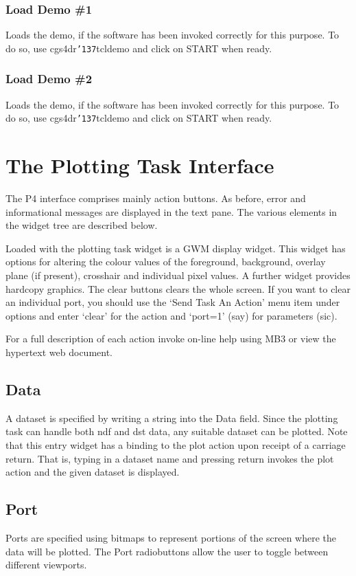 \documentclass[a4paper]{book}
\renewcommand{\_}{{\tt\char'137}}
\begin{document}
\subsubsection{Load Demo \#1}
Loads the demo, if the software has been invoked correctly for this purpose.
To do so, use cgs4dr\_tcldemo and click on START when ready.

\subsubsection{Load Demo \#2}
Loads the demo, if the software has been invoked correctly for this purpose.
To do so, use cgs4dr\_tcldemo and click on START when ready.

\section{The Plotting Task Interface}
The P4 interface comprises mainly action buttons.
As before, error and informational messages are displayed in the text pane.
The various elements in the widget tree are described below. 

Loaded with the plotting task widget is a GWM display widget. This widget
has options for altering the colour values of the foreground, background,
overlay plane (if present), crosshair and individual pixel values. A further
widget provides hardcopy graphics. The {\sc clear} buttons clears the whole screen.
If you want to clear an individual port, you should use the `Send Task An Action'
menu item under options and enter `clear' for the {\sc action} and `port=1' (say)
for {\sc parameters} (sic).

For a full description of each action invoke on-line help using MB3 or view the hypertext web document.

\subsection{Data}
A dataset is specified by writing a string into the {\sf Data} field. Since
the plotting task can handle both {\sc ndf} and {\sc dst} data, any suitable
dataset can be plotted. Note that this entry widget has a binding to the plot
action upon receipt of a carriage return. That is, typing in a dataset name
and pressing {\sc return} invokes the plot action and the given dataset is
displayed.

\subsection{Port}
Ports are specified using bitmaps to represent portions of the screen 
where the data will be plotted. 
The {\sf Port} radiobuttons allow the user to toggle between different viewports.
\end{document}
